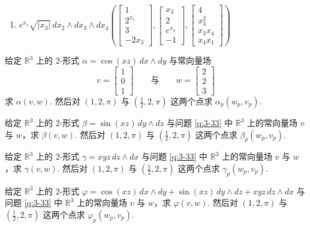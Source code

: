 \begin{question}
\begin{enumerate}
  \item[(f)] $e^{x_1}\sqrt{|x_3|}\,dx_2\wedge dx_3\wedge dx_4\left(\begin{bmatrix}1\\2^{x_1}\\3\\-2x_3\end{bmatrix},\begin{bmatrix}x_3\\2\\e^{x_4}\\-1\end{bmatrix},\begin{bmatrix}4\\x_3^2\\x_3x_4\\x_4x_1\end{bmatrix}\right)$
\end{enumerate}
\end{question}

\begin{question}\label{q:3-33}
给定 $\mathbb{R}^3$ 上的 2-形式 $\alpha=\cos(xz)\,dx\wedge dy$ 与常向量场
\[
v=\begin{bmatrix}1\\0\\1\end{bmatrix}\qquad\text{与}\qquad
w=\begin{bmatrix}2\\2\\3\end{bmatrix}
\]
求 $\alpha(v,w)$. 然后对 $(1,2,\pi)$ 与 $\left(\frac{1}{2},2,\pi\right)$ 这两个点求 $\alpha_p(w_p,v_p)$.
\end{question}

\begin{question}\label{q:3-34}
给定 $\mathbb{R}^3$ 上的 2-形式 $\beta=\sin(xz)\,dy\wedge dz$ 与问题 \ref{q:3-33} 中 $\mathbb{R}^3$ 上的常向量场 $v$ 与 $w$，求 $\beta(v,w)$. 然后对 $(1,2,\pi)$ 与 $\left(\frac{1}{2},2,\pi\right)$ 这两个点求 $\beta_p(w_p,v_p)$.
\end{question}

\begin{question}\label{q:3-35}
给定 $\mathbb{R}^3$ 上的 2-形式 $\gamma=xyz\,dz\wedge dx$ 与问题 \ref{q:3-33} 中 $\mathbb{R}^3$ 上的常向量场 $v$ 与 $w$，求 $\gamma(v,w)$. 然后对 $(1,2,\pi)$ 与 $\left(\frac{1}{2},2,\pi\right)$ 这两个点求 $\gamma_p(w_p,v_p)$.
\end{question}

\begin{question}\label{q:3-36}
给定 $\mathbb{R}^3$ 上的 2-形式 $\varphi=\cos(xz)\,dx\wedge dy+\sin(xz)\,dy\wedge dz+xyz\,dz\wedge dx$ 与问题 \ref{q:3-33} 中 $\mathbb{R}^3$ 上的常向量场 $v$ 与 $w$，求 $\varphi(v,w)$. 然后对 $(1,2,\pi)$ 与 $\left(\frac{1}{2},2,\pi\right)$ 这两个点求 $\varphi_p(w_p,v_p)$.
\end{question}

